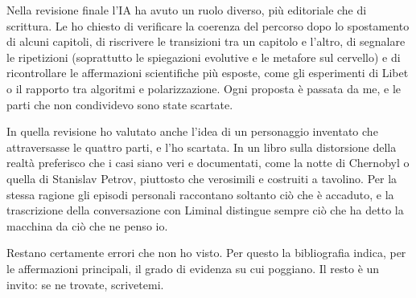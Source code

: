 Nella revisione finale l'IA ha avuto un ruolo diverso, più editoriale che di scrittura. Le ho chiesto di verificare la coerenza del percorso dopo lo spostamento di alcuni capitoli, di riscrivere le transizioni tra un capitolo e l'altro, di segnalare le ripetizioni (soprattutto le spiegazioni evolutive e le metafore sul cervello) e di ricontrollare le affermazioni scientifiche più esposte, come gli esperimenti di Libet o il rapporto tra algoritmi e polarizzazione. Ogni proposta è passata da me, e le parti che non condividevo sono state scartate.

In quella revisione ho valutato anche l'idea di un personaggio inventato che attraversasse le quattro parti, e l'ho scartata. In un libro sulla distorsione della realtà preferisco che i casi siano veri e documentati, come la notte di Chernobyl o quella di Stanislav Petrov, piuttosto che verosimili e costruiti a tavolino. Per la stessa ragione gli episodi personali raccontano soltanto ciò che è accaduto, e la trascrizione della conversazione con Liminal distingue sempre ciò che ha detto la macchina da ciò che ne penso io.

Restano certamente errori che non ho visto. Per questo la bibliografia indica, per le affermazioni principali, il grado di evidenza su cui poggiano. Il resto è un invito: se ne trovate, scrivetemi.


